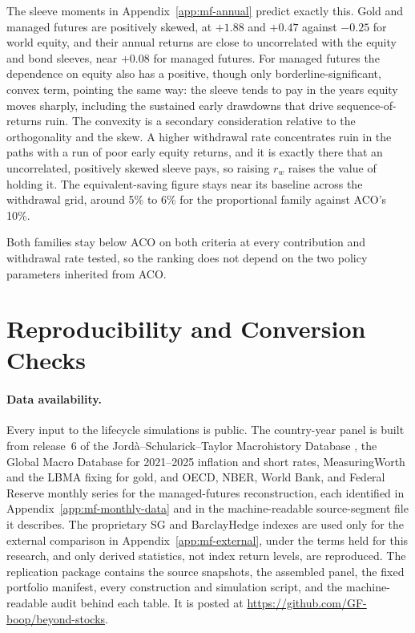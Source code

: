 \documentclass[11pt]{article}
\begin{document}
The sleeve moments in Appendix~\ref{app:mf-annual} predict exactly this.
Gold and managed futures are positively skewed, at $+1.88$ and $+0.47$
against $-0.25$ for world equity, and their annual returns are close to
uncorrelated with the equity and bond sleeves, near $+0.08$ for managed
futures. For managed futures the dependence on equity also has a positive,
though only borderline-significant, convex term, pointing the same way: the
sleeve tends to pay in the years equity moves sharply, including the
sustained early drawdowns that drive sequence-of-returns ruin. The convexity
is a secondary consideration relative to the orthogonality and the skew. A
higher withdrawal rate concentrates ruin in the paths with a run of poor
early equity returns, and it is exactly there that an uncorrelated,
positively skewed sleeve pays, so raising $r_w$ raises the value of holding
it. The equivalent-saving figure stays near its baseline across the
withdrawal grid, around 5\% to 6\% for the proportional family against ACO's
10\%.

Both families stay below ACO on both criteria at every contribution and
withdrawal rate tested, so the ranking does not depend on the two policy
parameters inherited from ACO.



\section{Reproducibility and Conversion Checks}

\paragraph{Data availability.} Every input to the lifecycle simulations is
public. The country-year panel is
built from release~6 of the Jord{\`a}--Schularick--Taylor Macrohistory Database
\citep{MacrohistoryDB}, the Global Macro Database \citep{MullerXuLehbibChen2025}
for 2021--2025 inflation and short rates, MeasuringWorth
\citep{OfficerWilliamsonMeasuringWorth} and the LBMA fixing \citep{LBMA} for
gold, and OECD, NBER, World Bank, and Federal Reserve monthly series for the
managed-futures reconstruction, each identified in
Appendix~\ref{app:mf-monthly-data} and in the machine-readable source-segment
file it describes. The proprietary SG and BarclayHedge indexes are used only
for the external comparison in Appendix~\ref{app:mf-external}, under the terms
held for this research, and only derived statistics, not index return levels,
are reproduced. The replication package contains the source snapshots, the
assembled panel, the fixed portfolio manifest, every construction and
simulation script, and the machine-readable audit behind each table. It is
posted at \url{https://github.com/GF-boop/beyond-stocks}.
\end{document}
